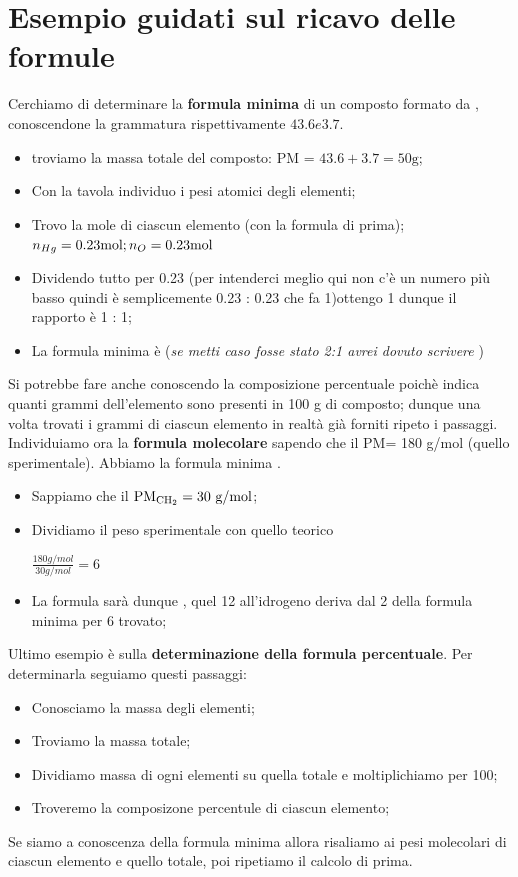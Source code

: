 \documentclass[11pt, a4paper, openright]{book}
\begin{document}
\section{Esempio guidati sul ricavo delle formule}
Cerchiamo di determinare la \textbf{formula minima} di un composto formato da , conoscendone la grammatura rispettivamente $43.6 e 3.7$.
\begin{itemize}
    \item troviamo la massa totale del composto: PM = $43.6 + 3.7 = 50 \text{g}$;
    \item Con la tavola individuo i pesi atomici degli elementi;
    \item Trovo la mole di ciascun elemento (con la formula di prima); $n_{Hg}= 0.23 \text{mol};
 \\ n_O= 0.23 \text{mol}$
    \item Dividendo tutto per 0.23 (per intenderci meglio qui non c'è un numero più basso quindi è semplicemente 0.23 : 0.23 che fa 1)ottengo 1 dunque il rapporto è 1 : 1;
    \item La formula minima è  (\textit{se metti caso fosse stato 2:1 avrei dovuto scrivere })
\end{itemize}
Si potrebbe fare anche conoscendo la composizione percentuale  poichè  indica quanti grammi dell'elemento sono presenti in 100 g di
composto; dunque una volta trovati i grammi di ciascun elemento in realtà già forniti ripeto i passaggi.
Individuiamo ora la \textbf{formula molecolare} sapendo che il PM= 180 g/mol (quello sperimentale). Abbiamo la formula minima .
\begin{itemize}
    \item Sappiamo che il $\text{PM}_{\ce{CH_2}} = 30 \text{ g/mol}$;
    \item Dividiamo il peso sperimentale con quello teorico
    \begin{center}
        $\frac{180 g/mol}{30 g/mol} = 6$ 
    \end{center} 
    \item La formula sarà dunque , quel 12 all'idrogeno deriva dal 2 della formula minima per 6 trovato;
\end{itemize}
Ultimo esempio è sulla \textbf{determinazione della formula percentuale}. Per determinarla seguiamo questi passaggi:
\begin{itemize}
    \item Conosciamo la massa degli elementi;
    \item Troviamo la massa totale;
    \item Dividiamo massa di ogni elementi su quella totale e moltiplichiamo per 100;
    \item Troveremo la composizone percentule di ciascun elemento;
\end{itemize}
Se siamo a conoscenza della formula minima allora risaliamo ai pesi molecolari di ciascun elemento e quello totale, poi ripetiamo il calcolo di prima.
\newpage
\end{document}
